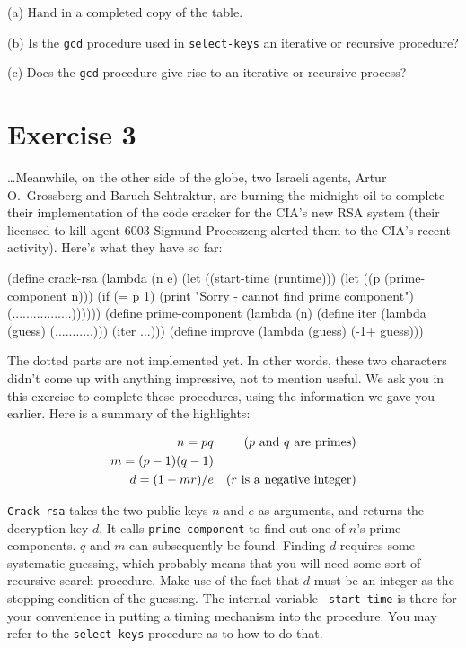 (a) Hand in a completed copy of the table.

(b) Is the {\tt gcd} procedure used in {\tt select-keys} an iterative
or recursive procedure? 

(c) Does the {\tt gcd} procedure give rise to an iterative or recursive
process? 

\section{Exercise 3}

\ldots Meanwhile, on the other side of the globe, two Israeli agents,
Artur O.\ Grossberg and Baruch Schtraktur, 
are burning the midnight oil to complete their implementation of the
code cracker for the CIA's new RSA system (their licensed-to-kill agent 6003
Sigmund Proceszeng alerted them to the CIA's recent activity).  Here's
what they have so far:

\beginlisp
(define crack-rsa
  (lambda (n e)
    (let ((start-time (runtime)))
      (let ((p (prime-component n)))
        (if (= p 1)
            (print "Sorry - cannot find prime component")
            (.................))))))
\null
(define prime-component
  (lambda (n)
    (define iter
      (lambda (guess)
        (...........)))
    (iter ...)))
\null
(define improve
  (lambda (guess)
    (-1+ guess)))
\endlisp

The dotted parts are not implemented yet.  In other words, these two characters
didn't come up with anything impressive, not to mention useful.  We ask you
in this exercise to complete these procedures, using the information we gave
you earlier.  Here is a summary of the highlights:

\begin{eqnarray*}
n = pq && \hbox{\rm ($p$ and $q$ are primes)}\\
m = (p - 1)(q - 1)&& \\
d = (1 - mr)/e && \hbox{\rm ($r$ is a negative integer)}
\end{eqnarray*}

{\tt Crack-rsa} takes the two public keys $n$ and $e$ as arguments,
and returns the decryption key $d$.  It calls {\tt prime-component} to
find out one of $n$'s prime components.  $q$ and $m$ can subsequently
be found.  Finding $d$ requires some systematic guessing, which
probably means that you will need some sort of recursive search
procedure.  Make use of the fact that $d$ must be an integer as the
stopping condition of the guessing.  The internal variable {\tt
start-time} is there for your convenience in putting a timing
mechanism into the procedure.  You may refer to the {\tt select-keys}
procedure as to how to do that.

